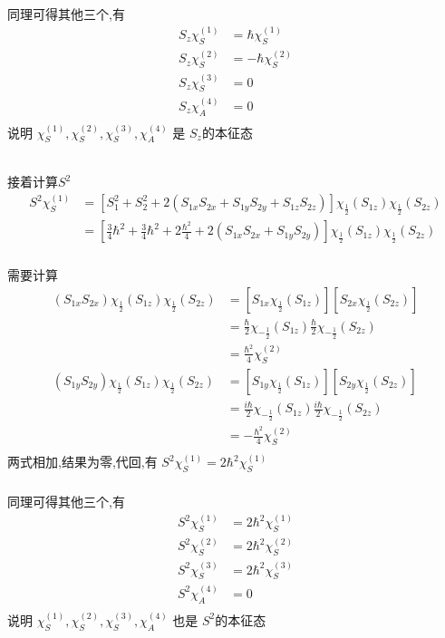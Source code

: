 \begin{frame}[label=current]
  \frametitle{}
同理可得其他三个,有
\[ \begin{aligned}
  S_z \chi ^{(1)}_S &= \hbar \chi ^{(1)}_S \\
  S_z \chi ^{(2)}_S &= -\hbar \chi ^{(2)}_S \\
  S_z \chi ^{(3)}_S &= 0 \\
  S_z \chi ^{(4)}_A &= 0 \\
\end{aligned}
\]
说明 $\chi ^{(1)}_S, \chi ^{(2)}_S, \chi ^{(3)}_S, \chi ^{(4)}_A$ 是 $S_z$的本征态 

~~\\ 
接着计算$S^2$
\[ \begin{aligned}
  S^2 \chi ^{(1)}_S &= \left[S^2_1 + S^2_2 + 2(S_{1x}S_{2x} +S_{1y}S_{2y} + S_{1z}S_{2z} )\right] \chi _{ \frac{1}{2}} (S_{1z})\chi_{ \frac{1}{2}} (S_{2z}) \\ 
  &= \left[\frac{3}{4}\hbar^2 + \frac{3}{4}\hbar^2 + 2\frac{\hbar^2}{4}+ 2 (S_{1x}S_{2x} +S_{1y}S_{2y}  )\right] \chi _{ \frac{1}{2}} (S_{1z})\chi_{ \frac{1}{2}} (S_{2z}) 
\end{aligned}
\]
\end{frame} 

\begin{frame}[label=current]
  \frametitle{}
需要计算 
\[ \begin{aligned}
  (S_{1x}S_{2x})  \chi _{ \frac{1}{2}} (S_{1z})\chi_{ \frac{1}{2}} (S_{2z})  &=\left[S_{1x}\chi _{ \frac{1}{2}} (S_{1z})\right]\left[S_{2x}\chi_{ \frac{1}{2}} (S_{2z})\right] \\
  &= \frac{\hbar}{2} \chi _{ -\frac{1}{2}} (S_{1z}) \frac{\hbar}{2} \chi _{ -\frac{1}{2}} (S_{2z}) \\
  &= \frac{\hbar^2}{4} \chi ^{(2)}_S  \\
  (S_{1y}S_{2y})  \chi _{ \frac{1}{2}} (S_{1z})\chi_{ \frac{1}{2}} (S_{2z})  &=\left[S_{1y}\chi _{ \frac{1}{2}} (S_{1z})\right]\left[S_{2y}\chi_{ \frac{1}{2}} (S_{2z})\right] \\
  &= \frac{i\hbar}{2} \chi _{ -\frac{1}{2}} (S_{1z}) \frac{i\hbar}{2} \chi _{ -\frac{1}{2}} (S_{2z}) \\
  &= -\frac{\hbar^2}{4} \chi ^{(2)}_S  \\
\end{aligned}
\]
两式相加,结果为零,代回,有 $S^2 \chi ^{(1)}_S = 2 \hbar^2  \chi ^{(1)}_S$
\end{frame} 

\begin{frame}[label=current]
  \frametitle{}
  同理可得其他三个,有
  \[ \begin{aligned}
    S^2 \chi ^{(1)}_S &= 2 \hbar^2  \chi ^{(1)}_S \\
    S^2 \chi ^{(2)}_S &= 2 \hbar^2  \chi ^{(2)}_S \\
    S^2 \chi ^{(3)}_S &= 2 \hbar^2  \chi ^{(3)}_S \\
    S^2 \chi ^{(4)}_A &= 0 \\
  \end{aligned}
  \]
  说明 $\chi ^{(1)}_S, \chi ^{(2)}_S, \chi ^{(3)}_S, \chi ^{(4)}_A$ 也是 $S^2$的本征态 
\end{frame} 

